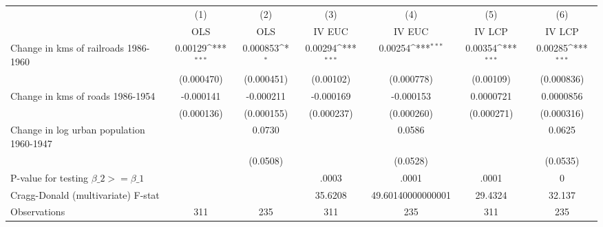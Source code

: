 {
\def\sym#1{\ifmmode^{#1}\else\(^{#1}\)\fi}
\begin{tabular}{l*{6}{c}}
\hline\hline
                &\multicolumn{1}{c}{(1)}&\multicolumn{1}{c}{(2)}&\multicolumn{1}{c}{(3)}&\multicolumn{1}{c}{(4)}&\multicolumn{1}{c}{(5)}&\multicolumn{1}{c}{(6)}\\
                &\multicolumn{1}{c}{OLS}&\multicolumn{1}{c}{OLS}&\multicolumn{1}{c}{IV EUC}&\multicolumn{1}{c}{IV EUC}&\multicolumn{1}{c}{IV LCP}&\multicolumn{1}{c}{IV LCP}\\
\hline
Change in kms of railroads 1986-1960&  0.00129\sym{***}& 0.000853\sym{*}  &  0.00294\sym{***}&  0.00254\sym{***}&  0.00354\sym{***}&  0.00285\sym{***}\\
                &(0.000470)         &(0.000451)         &(0.00102)         &(0.000778)         &(0.00109)         &(0.000836)         \\
[1em]
Change in kms of roads 1986-1954&-0.000141         &-0.000211         &-0.000169         &-0.000153         &0.0000721         &0.0000856         \\
                &(0.000136)         &(0.000155)         &(0.000237)         &(0.000260)         &(0.000271)         &(0.000316)         \\
[1em]
Change in log urban population 1960-1947&                  &   0.0730         &                  &   0.0586         &                  &   0.0625         \\
                &                  & (0.0508)         &                  & (0.0528)         &                  & (0.0535)         \\
\hline
P-value for testing $\beta\_{2} >= \beta\_{1}$&                  &                  &    .0003         &    .0001         &    .0001         &        0         \\
Cragg-Donald (multivariate) F-stat&                  &                  &  35.6208         &49.60140000000001         &  29.4324         &   32.137         \\
Observations    &      311         &      235         &      311         &      235         &      311         &      235         \\
\hline\hline
\end{tabular}
}
